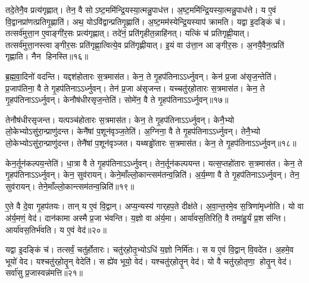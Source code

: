 तदे॒तेनै॒व प्रत्य॑गृह्णात्।
तेन॒ वै सोऽष्ट॒ममि॑न्द्रि॒यस्या॒त्मन्नु॒पाध॑त्त।
अ॒ष्ट॒ममि॑न्द्रि॒यस्या॒त्मन्नु॒पाध॑त्ते।
य ए॒वं वि॒द्वानप्रा॑णत्प्रतिगृ॒ह्णाति॑।
अथ॒ योऽवि॑द्वान्प्रतिगृ॒ह्णाति॑।
अ॒ष्ट॒मम॑स्येन्द्रि॒यस्याप॑ क्रामति।
यद्वा इ॒दङ्किं च॑।
तत्सर्व॑मुत्ता॒न ए॒वाङ्गी॑र॒सः प्रत्य॑गृह्णात्।
तदे॑नं॒ प्रति॑गृहीत॒न्नाहि॑नत्।
यत्किं च॑ प्रतिगृह्णी॒यात्।
तत्सर्व॑मुत्ता॒नस्त्वाङ्गीर॒सः प्रति॑गृह्णा॒त्वित्ये॒व प्रति॑गृह्णीयात्।
इ॒यं वा उ॑त्ता॒न आङ्गीर॒सः।
अ॒नयै॒वैन॒त्प्रति॑ गृह्णाति।
नैन हिनस्ति॥१६॥\anuvakamend[तृती॑यमिन्द्रि॒यस्यापाक्रामच्चतु॒र्थमि॑न्द्रि॒यस्या॒त्मन्नु॒पाध॒त्ताश्वं॑ प्रतिगृ॒ह्णाति॑ ष॒ष्ठम॑स्येन्द्रि॒यस्याप॑क्रामत्यष्ट॒ममि॑न्द्रि॒यस्यापाक्रामत्प्रतिगृह्णी॒याच्च॒त्वारि॑ च (तस्य॒ वा अ॒ग्नेर्‌हिर॑ण्य॒ सोम॑स्य॒ वास॒स्तदे॒तेन॑ रु॒द्रस्य॒ गान्तामे॒तेन॒ वरु॑ण॒स्याश्वं॑ प्र॒जाप॑ते॒ पुरु॑षं॒ मनो॒स्तल्प॒न्तमे॒तेनोत्ता॒नस्य॒ तदे॒तेनाप्रा॑ण॒द्यद्वै।
अ॒र्धं तृती॑यमष्ट॒मं तच्च॑तु॒र्थं तां प॑ञ्च॒म ष॒ष्ठ स॑प्त॒मन्तम्।
तदे॒तेन॒ द्वे तामे॒तेनैकं॒ तमे॒तेन॒ त्रीणि॒ तदे॒तेनैकम्॥)]

ब्र॒ह्म॒वा॒दिनो॑ वदन्ति।
यद्दश॑होतारः स॒त्रमास॑त।
केन॒ ते गृ॒हप॑तिनाऽऽर्ध्नुवन्।
केन॑ प्र॒जा अ॑सृज॒न्तेति॑।
प्र॒जाप॑तिना॒ वै ते गृ॒हप॑तिनाऽऽर्ध्नुवन्।
तेन॑ प्र॒जा अ॑सृजन्त।
यच्चतु॑र्‌होतारः स॒त्रमास॑त।
केन॒ ते गृ॒हप॑तिनाऽऽर्ध्नुवन्।
केनौष॑धीरसृज॒न्तेति॑।
सोमे॑न॒ वै ते गृ॒हप॑तिनाऽऽर्ध्नुवन्॥१७॥

तेनौष॑धीरसृजन्त।
यत्पञ्च॑होतारः स॒त्रमास॑त।
केन॒ ते गृ॒हप॑तिनाऽऽर्ध्नुवन्।
केनै॒भ्यो लो॒केभ्योऽसु॑रा॒न्प्राणु॑दन्त।
केनै॑षां प॒शून॑वृञ्ज॒तेति॑।
अ॒ग्निना॒ वै ते गृ॒हप॑तिनाऽऽर्ध्नुवन्।
तेनै॒भ्यो लो॒केभ्योऽसु॑रा॒न्प्राणु॑दन्त।
तेनै॑षां प॒शून॑वृञ्जत।
यथ्षड्ढो॑तारः स॒त्रमास॑त।
केन॒ ते गृ॒हप॑तिनाऽऽर्ध्नुवन्॥१८॥

केन॒र्तून॑कल्पय॒न्तेति॑।
धा॒त्रा वै ते गृ॒हप॑तिनाऽऽर्ध्नुवन्।
तेन॒र्तून॑कल्पयन्त।
यत्स॒प्तहो॑तारः स॒त्रमास॑त।
केन॒ ते गृ॒हप॑तिनाऽऽर्ध्नुवन्।
केन॒ सुव॑रायन्।
केने॒माँल्लो॒कान्त्सम॑तन्व॒न्निति॑।
अ॒र्य॒म्णा वै ते गृ॒हप॑तिनाऽऽर्ध्नुवन्।
तेन॒ सुव॑रायन्।
तेने॒माँल्लो॒कान्त्सम॑तन्व॒न्निति॑॥१९॥

ए॒ते वै दे॒वा गृ॒हप॑तयः।
तान् य ए॒वं वि॒द्वान्।
अप्य॒न्यस्य॑ गार्‌हप॒ते दीक्ष॑ते।
अ॒वा॒न्त॒रमे॒व स॒त्रिणा॑मृध्नोति।
यो वा अ॑र्य॒मणं॒ वेद॑।
दान॑कामा अस्मै प्र॒जा भ॑वन्ति।
य॒ज्ञो वा अ॑र्य॒मा।
आर्या॑वस॒तिरिति॒ वै तमा॑हु॒र्यं प्र॒शस॑न्ति।
आर्या॑वस॒तिर्भ॑वति।
य ए॒वं वेद॑॥२०॥

यद्वा इ॒दङ्किं च॑।
तत्सर्वं॒ चतु॑र्\mbox{}होतारः।
चतु॑र्‌होतृ॒भ्योऽधि॑ य॒ज्ञो निर्मि॑तः।
स य ए॒वं वि॒द्वान्‌ वि॒वदे॑त।
अ॒हमे॒व भूयो॑ वेद।
यश्चतु॑र्‌होतॄ॒न् वेदेति॑।
स ह्ये॑व भूयो॒ वेद॑।
यश्चतु॑र्‌होतॄ॒न् वेद॑।
यो वै चतु॑र्‌होतृणा॒ होतॄ॒न् वेद॑।
सर्वा॑सु प्र॒जास्वन्न॑मत्ति॥२१॥

